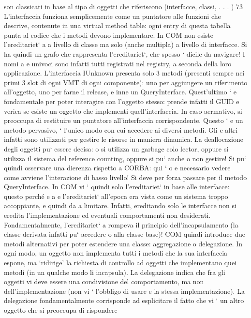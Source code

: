 \documentclass[a4paper,12pt]{article}
\begin{document}
son classicati in base al tipo di oggetti che riferiscono (interfacce, classi, . . . )
73
L'interfaccia funziona semplicemente come un puntatore alle funzioni che descrive, contenute in una virtual method
table: ogni entry di questa tabella punta
al codice che i metodi devono implementare. In COM non esiste l'ereditariet`
a
a livello di classe ma solo (anche multipla) a livello di interfacce. Si ha quindi
un grafo che rappresenta l'ereditariet`, che spesso ` dicile da navigare! I nomi
a
e
univoci sono infatti tutti registrati nel registry, a seconda della loro applicazione.
L'interfaccia IUnknown presenta solo 3 metodi (presenti sempre nei primi
3 slot di ogni VMT di ogni componente): uno per aggiungere un riferimento
all'oggetto, uno per farne il release, e inne un QueryInterface. Quest'ultimo `
e
fondamentale per poter interagire con l'oggetto stesso: prende infatti il GUID e
verica se esiste un oggetto che implementi quell'interfaccia. In caso aermativo,
si preoccupa di restituire un puntatore all'interfaccia corrispondente. Questo `
e
un metodo pervasivo, ` l'unico modo con cui accedere ai diversi metodi. Gli
e
altri infatti sono utilizzati per gestire le risorse in maniera dinamica.
La deallocazione degli oggetti pu` essere decisa: o si utilizza un garbage colo
lector, oppure si utilizza il sistema del reference counting, oppure si pu` anche
o
non gestire! Si pu` quindi osservare una dierenza rispetto a CORBA: qui `
o
e
necessario vedere come avviene l'interazione di basso livello! Si deve per forza
passare per il metodo QueryInterface.
In COM vi ` quindi solo l'ereditariet` in base alle interfacce: questo perché
e
a
e
l'ereditariet` all'epoca era vista come un sistema troppo accoppiante, e quindi da
a
limitare. Infatti, ereditando solo le interfacce non si eredita l'implementazione
ed eventuali comportamenti non desiderati. Fondamentalmente, l'ereditariet`
a
rompeva il principio dell'incapsulamento (la classe derivata infatti pu` accedere
o
alla classe base)!
COM quindi introduce due metodi alternativi per poter estendere una classe:
aggregazione o delegazione. In ogni modo, un oggetto non implementa tutti i
metodi che la sua interfaccia espone, ma {`}ridirige' la richiesta di controllo ad
oggetti che implementano quei metodi (in un qualche modo li incapsula).
La delegazione indica che fra gli oggetti vi deve essere una condivisione
del comportamento, ma non dell'implementazione (non vi ` l'obbligo di usare
e
la stessa implementazione). La delegazione fondamentalmente corrisponde ad
esplicitare il fatto che vi ` un altro oggetto che si preoccupa di rispondere
\end{document}

